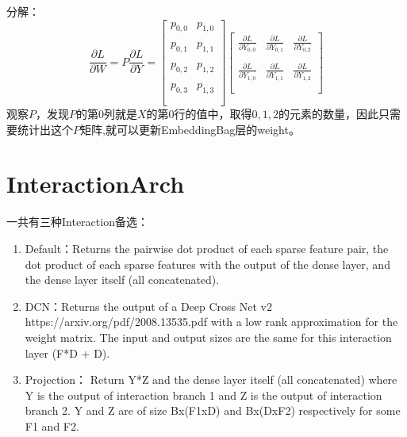 \documentclass{article}
\begin{document}
分解：
$$
\frac{\partial L}{\partial W} =
P\frac{\partial L}{\partial Y} = 
\left[
    \begin{array}{ccc}
        p_{0,0} & p_{1,0}  \\\\
        p_{0,1} & p_{1,1}  \\\\
        p_{0,2} & p_{1,2}  \\\\
        p_{0,3} & p_{1,3}  \\\\
    \end{array}
\right]
\left[
    \begin{array}{ccc}
        \frac{\partial L}{\partial Y_{0,0}} & \frac{\partial L}{\partial Y_{0,1}} & \frac{\partial L}{\partial Y_{0,2}}\\\\
        \frac{\partial L}{\partial Y_{1,0}} & \frac{\partial L}{\partial Y_{1,1}} & \frac{\partial L}{\partial Y_{1,2}}\\\\
    \end{array}
\right]
$$
观察$P$，发现$P$的第0列就是$X$的第0行的值中，取得$0,1,2$的元素的数量，因此只需要统计出这个$P$矩阵,就可以更新EmbeddingBag层的weight。

\section{InteractionArch}
一共有三种Interaction备选：
\begin{enumerate}
    \item Default：Returns the pairwise dot product of each sparse feature pair, the dot product of each sparse features with the output of the dense layer, and the dense layer itself (all concatenated).
    \item DCN：Returns the output of a Deep Cross Net v2 https://arxiv.org/pdf/2008.13535.pdf with a low rank approximation for the weight matrix. The input and output sizes are the same for this interaction layer (F*D + D).
    \item Projection： Return Y*Z and the dense layer itself (all concatenated) where Y is the output of interaction branch 1 and Z is the output of interaction branch 2. Y and Z are of size Bx(F1xD) and Bx(DxF2) respectively for some F1 and F2.
\end{enumerate}
\end{document}
